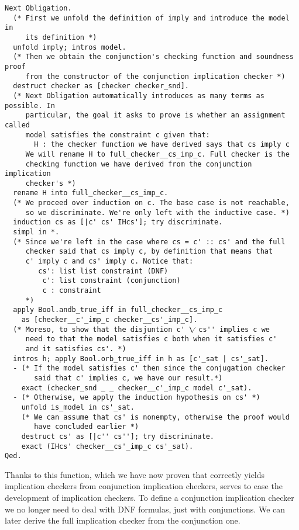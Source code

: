 \begin{verbatim}
Next Obligation.
  (* First we unfold the definition of imply and introduce the model in
     its definition *)
  unfold imply; intros model.
  (* Then we obtain the conjunction's checking function and soundness proof
     from the constructor of the conjunction implication checker *)
  destruct checker as [checker checker_snd].
  (* Next Obligation automatically introduces as many terms as possible. In
     particular, the goal it asks to prove is whether an assignment called 
     model satisfies the constraint c given that:
       H : the checker function we have derived says that cs imply c
     We will rename H to full_checker__cs_imp_c. Full checker is the
     checking function we have derived from the conjunction implication
     checker's *)
  rename H into full_checker__cs_imp_c.
  (* We proceed over induction on c. The base case is not reachable,
     so we discriminate. We're only left with the inductive case. *)
  induction cs as [|c' cs' IHcs']; try discriminate.
  simpl in *.
  (* Since we're left in the case where cs = c' :: cs' and the full
     checker said that cs imply c, by definition that means that
     c' imply c and cs' imply c. Notice that:
        cs': list list constraint (DNF)
         c': list constraint (conjunction)
         c : constraint
     *)
  apply Bool.andb_true_iff in full_checker__cs_imp_c 
    as [checker__c'_imp_c checker__cs'_imp_c].
  (* Moreso, to show that the disjuntion c' \⁄ cs'' implies c we
     need to that the model satisfies c both when it satisfies c' 
     and it satisfies cs'. *)
  intros h; apply Bool.orb_true_iff in h as [c'_sat | cs'_sat].
  - (* If the model satisfies c' then since the conjugation checker
       said that c' implies c, we have our result.*)
    exact (checker_snd _ _ checker__c'_imp_c model c'_sat).
  - (* Otherwise, we apply the induction hypothesis on cs' *)
    unfold is_model in cs'_sat.
    (* We can assume that cs' is nonempty, otherwise the proof would
       have concluded earlier *)
    destruct cs' as [|c'' cs'']; try discriminate.
    exact (IHcs' checker__cs'_imp_c cs'_sat).
Qed.
\end{verbatim}

Thanks to this function, which we have now proven that correctly yields
implication checkers from conjunction implication checkers, serves to ease the 
development of implication checkers. To define a conjunction implication checker
we no longer need to deal with DNF formulas, just with conjunctions. We can later
derive the full implication checker from the conjunction one.

